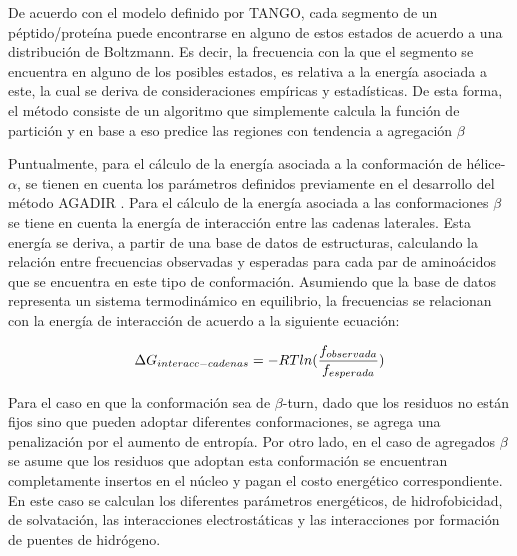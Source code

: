 De acuerdo con el modelo definido por TANGO, cada segmento de un péptido/proteína puede encontrarse en alguno de estos estados de acuerdo a una distribución de Boltzmann. 
Es decir, la frecuencia con la que el segmento se encuentra en alguno de los posibles estados, es relativa a la energía asociada a este, la cual se deriva de consideraciones empíricas y estadísticas. 
De esta forma, el método consiste de un algoritmo que simplemente calcula la función de partición y en base a eso predice las regiones con tendencia a agregación $\beta$

Puntualmente, para el cálculo de la energía asociada a la conformación de hélice-$\alpha$, se tienen en cuenta los parámetros definidos previamente en el desarrollo del método AGADIR \cite{lacroix1998elucidating}.
Para el cálculo de la energía asociada a las conformaciones $\beta$ se tiene en cuenta la energía de interacción entre las cadenas laterales.
Esta energía se deriva, a partir de una base de datos de estructuras, calculando la relación entre frecuencias observadas y esperadas para cada par de aminoácidos que se encuentra en este tipo de conformación.
Asumiendo que la base de datos representa un sistema termodinámico en equilibrio, la frecuencias se relacionan con la energía de interacción de acuerdo a la siguiente ecuación:

\begin{equation}
\large
 \Delta G_{interacc-cadenas}=-RTln(\frac{f_{observada}}{f_{esperada}})
\end{equation}


Para el caso en que la conformación sea de $\beta$-turn, dado que los residuos no están fijos sino que pueden adoptar diferentes conformaciones, se agrega una penalización por el aumento de entropía.
Por otro lado, en el caso de agregados $\beta$ se asume que los residuos que adoptan esta conformación se encuentran completamente insertos en el núcleo y pagan el costo energético correspondiente. 
En este caso se calculan los diferentes parámetros energéticos, de hidrofobicidad, de solvatación, las interacciones electrostáticas y las interacciones por formación de puentes de hidrógeno.

